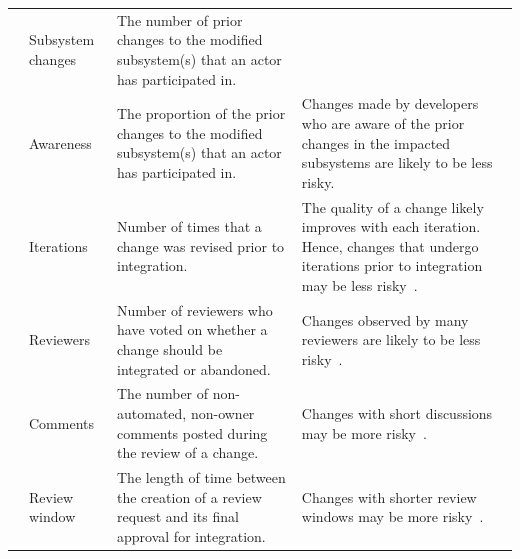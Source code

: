 \begin{table}[ht!]
{\begin{tabular}{|c|p{2cm}|p{5.7cm}|p{8.4cm}|}
			\cline{2-3}
			& Subsystem changes & The number of prior changes to the modified subsystem(s) that an actor has participated in. & \\
			\cline{2-4}
			& Awareness & The proportion of the prior changes to the modified subsystem(s) that an actor has participated in. & Changes made by developers who are aware of the prior changes in the impacted subsystems are likely to be less risky. \\
			\hline
			\multirow{12}{*}{\rotatebox{90}{Review}}
			& Iterations & Number of times that a change was revised prior to integration. & The quality of a change likely improves with each iteration. Hence, changes that undergo iterations prior to integration may be less risky~\cite{porter1998tosem, thongtanunam2015msr}.\\
			\cline{2-4}
			& Reviewers & Number of reviewers who have voted on whether a change should be integrated or abandoned. & Changes observed by many reviewers are likely to be less risky~\cite{Raymond2001}. \\
			\cline{2-4}
			& Comments & The number of non-automated, non-owner comments posted during the review of a change. & Changes with short discussions may be more risky~\cite{mcintosh2014impact, mcintosh2016empirical}.\\
			\cline{2-4}
			& Review window & The length of time between the creation of a review request and its final approval for integration. & Changes with shorter review windows may be more risky~\cite{porter1998tosem, thongtanunam2015msr}.\\
			\hline
		\end{tabular}
	}
\end{table}

